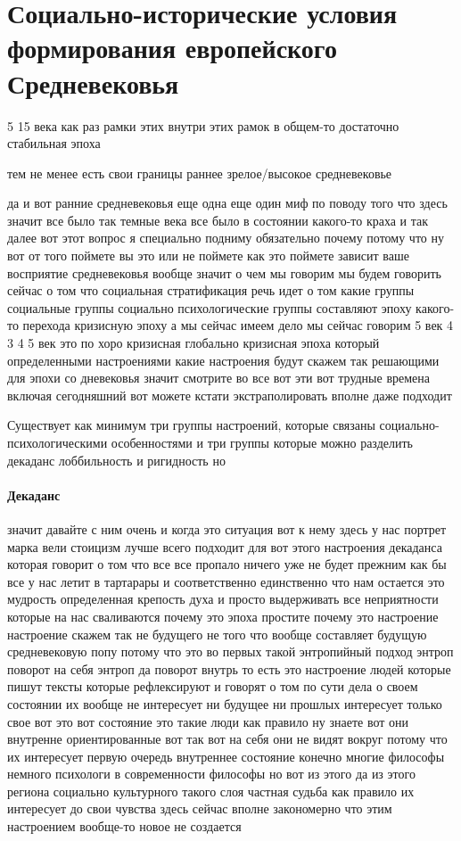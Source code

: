 \section{Социально-исторические условия формирования европейского Средневековья}

5 15 века как раз рамки этих внутри этих рамок в общем-то достаточно стабильная эпоха  

тем не менее есть свои границы 
раннее 
зрелое/высокое средневековье

да и вот ранние средневековья еще одна еще один миф по поводу того
что здесь значит все было так темные века все было в состоянии какого-то краха и
так далее вот этот вопрос я специально подниму обязательно почему потому что ну
вот от того поймете вы это или не поймете как это поймете зависит ваше
восприятие средневековья вообще значит о чем мы говорим мы будем говорить сейчас
о том что социальная стратификация речь идет о том какие группы социальные
группы социально психологические группы составляют эпоху какого-то перехода
кризисную эпоху а мы сейчас имеем дело мы сейчас говорим 5 век 4 3 4 5 век это
по хоро кризисная глобально кризисная эпоха который определенными настроениями
какие настроения будут скажем так решающими для эпохи со дневековья значит
смотрите во все вот эти вот трудные времена включая сегодняшний вот можете
кстати экстраполировать вполне даже подходит 

Существует как минимум три группы настроений, которые связаны социально-психологическими особенностями 
и три группы которые можно
разделить декаданс лоббильность и ригидность но 

\paragraph{Декаданс} 
значит давайте с ним очень и когда это ситуация вот к нему здесь у нас портрет марка вели стоицизм лучше всего подходит для вот этого настроения декаданса которая говорит о том что все все пропало ничего уже не будет прежним как бы все у нас летит в
тартарары и соответственно единственно что нам остается это мудрость
определенная крепость духа и просто выдерживать все неприятности которые на нас
сваливаются почему это эпоха простите почему это настроение настроение скажем
так не будущего не того что вообще составляет будущую средневековую попу потому
что это во первых такой энтропийный подход энтроп поворот на себя энтроп да
поворот внутрь то есть это настроение людей которые пишут тексты которые
рефлексируют и говорят о том по сути дела о своем состоянии их вообще не
интересует ни будущее ни прошлых интересует только свое вот это вот состояние
это такие люди как правило ну знаете вот они внутренне ориентированные вот так
вот на себя они не видят вокруг потому что их интересует первую очередь
внутреннее состояние конечно многие философы немного психологи в современности
философы но вот из этого да из этого региона социально культурного такого слоя
частная судьба как правило их интересует до свои чувства здесь сейчас вполне
закономерно что этим настроением вообще-то новое не создается 

